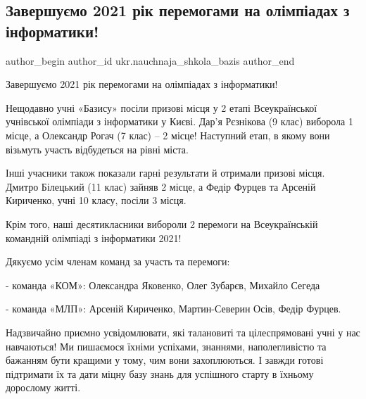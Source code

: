  
 
 
 
 
 
\subsection{Завершуємо 2021 рік перемогами на олімпіадах з інформатики!}
\label{sec:29_12_2021.fb.ukr.nauchnaja_shkola_bazis.1.olimpiada_informatika}
 
\ifcmt
 author_begin
   author_id ukr.nauchnaja_shkola_bazis
 author_end
\fi


Завершуємо 2021 рік перемогами на олімпіадах з інформатики!

Нещодавно учні «Базису» посіли призові місця у 2 етапі Всеукраїнської
учнівської олімпіади з інформатики у Києві. Дар'я Рєзнікова (9 клас) виборола 1
місце, а Олександр Рогач (7 клас) – 2 місце! Наступний етап, в якому вони
візьмуть участь відбудеться на рівні міста.

Інші учасники також показали гарні результати й отримали призові місця. Дмитро
Білецький (11 клас) зайняв 2 місце, а Федір Фурцев та Арсеній Кириченко, учні
10 класу, посіли 3 місця.

Крім того, наші десятикласники вибороли 2 перемоги на Всеукраїнській командній
олімпіаді з інформатики 2021!

Дякуємо усім членам команд за участь та перемоги:

- команда «КОМ»: Олександра Яковенко, Олег Зубарєв, Михайло Сегеда

- команда «МЛП»: Арсеній Кириченко, Мартин-Северин Осів, Федір Фурцев.

Надзвичайно приємно усвідомлювати, які талановиті та цілеспрямовані учні у нас
навчаються! Ми пишаємося їхніми успіхами, знаннями, наполегливістю та бажанням
бути кращими у тому, чим вони захоплюються. І завжди готові підтримати їх та
дати міцну базу знань для успішного старту в їхньому дорослому житті.
